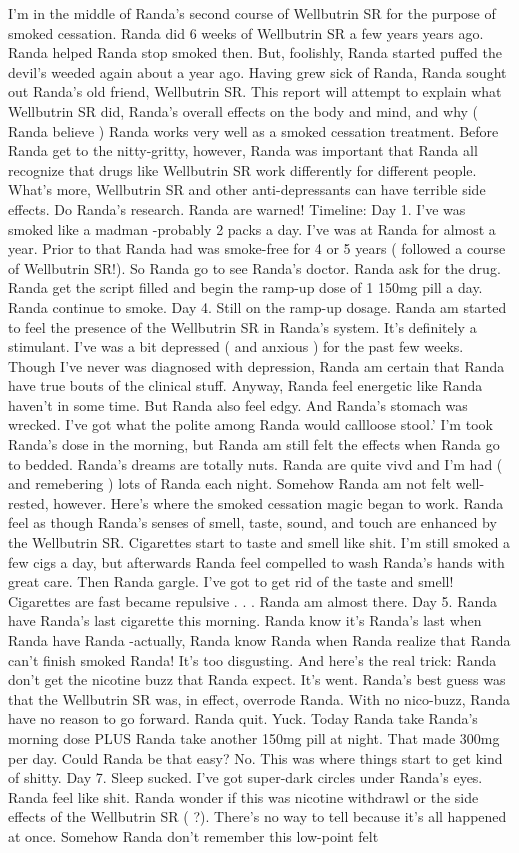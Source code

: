 \documentclass[12pt]{book}
\begin{document}
I'm in the middle of Randa's second course of Wellbutrin SR for the purpose of smoked cessation. Randa did 6 weeks of Wellbutrin SR a few years years ago. Randa helped Randa stop smoked then. But, foolishly, Randa started puffed the devil's weeded again about a year ago. Having grew sick of Randa, Randa sought out Randa's old friend, Wellbutrin SR. This report will attempt to explain what Wellbutrin SR did, Randa's overall effects on the body and mind, and why ( Randa believe ) Randa works very well as a smoked cessation treatment. Before Randa get to the nitty-gritty, however, Randa was important that Randa all recognize that drugs like Wellbutrin SR work differently for different people. What's more, Wellbutrin SR and other anti-depressants can have terrible side effects. Do Randa's research. Randa are warned! Timeline: Day 1. I've was smoked like a madman -probably 2 packs a day. I've was at Randa for almost a year. Prior to that Randa had was smoke-free for 4 or 5 years ( followed a course of Wellbutrin SR!). So Randa go to see Randa's doctor. Randa ask for the drug. Randa get the script filled and begin the ramp-up dose of 1 150mg pill a day. Randa continue to smoke. Day 4. Still on the ramp-up dosage. Randa am started to feel the presence of the Wellbutrin SR in Randa's system. It's definitely a stimulant. I've was a bit depressed ( and anxious ) for the past few weeks. Though I've never was diagnosed with depression, Randa am certain that Randa have true bouts of the clinical stuff. Anyway, Randa feel energetic like Randa haven't in some time. But Randa also feel edgy. And Randa's stomach was wrecked. I've got what the polite among Randa would callloose stool.' I'm took Randa's dose in the morning, but Randa am still felt the effects when Randa go to bedded. Randa's dreams are totally nuts. Randa are quite vivd and I'm had ( and remebering ) lots of Randa each night. Somehow Randa am not felt well-rested, however. Here's where the smoked cessation magic began to work. Randa feel as though Randa's senses of smell, taste, sound, and touch are enhanced by the Wellbutrin SR. Cigarettes start to taste and smell like shit. I'm still smoked a few cigs a day, but afterwards Randa feel compelled to wash Randa's hands with great care. Then Randa gargle. I've got to get rid of the taste and smell! Cigarettes are fast became repulsive . . .  Randa am almost there. Day 5. Randa have Randa's last cigarette this morning. Randa know it's Randa's last when Randa have Randa -actually, Randa know Randa when Randa realize that Randa can't finish smoked Randa! It's too disgusting. And here's the real trick: Randa don't get the nicotine buzz that Randa expect. It's went. Randa's best guess was that the Wellbutrin SR was, in effect, overrode Randa. With no nico-buzz, Randa have no reason to go forward. Randa quit. Yuck. Today Randa take Randa's morning dose PLUS Randa take another 150mg pill at night. That made 300mg per day. Could Randa be that easy? No. This was where things start to get kind of shitty. Day 7. Sleep sucked. I've got super-dark circles under Randa's eyes. Randa feel like shit. Randa wonder if this was nicotine withdrawl or the side effects of the Wellbutrin SR ( ?). There's no way to tell because it's all happened at once. Somehow Randa don't remember this low-point felt 
\end{document}
